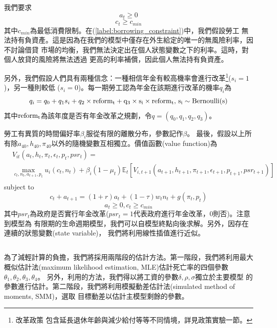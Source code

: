 \documentclass[12pt]{article}
\begin{document}
\begin{CJK*}{UTF8}{bkai}
我們要求
\begin{equation}\label{label:borrowing_constraint}
    a_t \geq 0
\end{equation}
\begin{equation}
    c_t \geq c_{min}
\end{equation}
其中$c_{min}$為最低消費限制。在(\ref{label:borrowing_constraint})中，我們假設勞工
無法持有負資產。這是因為在我們的模型中僅存在外生給定的唯一的無風險利率，因不討論借貸
市場的均衡，我們無法決定出在個人狀態變數之下的利率。這時，對個人放貸的風險將無法透過
更高的利率補償，因此個人無法持有負資產。

另外，我們假設人們具有兩種信念：一種相信年金有較高機率會進行改革\footnote{改革政策
包含延長退休年齡與減少給付等等不同情境，詳見政策實驗一節。}($s_i=1$)，另一種則較低
($s_i=0$)。每一期勞工認為年金在該期進行改革的機率$q_i$為
\begin{equation}
    q_i = q_0 + q_1 s_i + q_2\times \rm{reform_t} + q_3\times s_i\times \rm{reform_t} \text{, } s_i \sim Bernoulli(s)
\end{equation}
其中$\rm{reform_t}$為該年度是否有年金改革之規劃，令$q=(q_0, q_1, q_2, q_3)$。

勞工有異質的時間偏好率$\beta_i$服從有限的離散分布，參數記作$\beta$。
最後，假設以上所有除$a_{40}, h_{40}, \pi_{40}$以外的隨機變數互相獨立。價值函數(value function)為
\begin{equation}
    \begin{split}
        &V_{it}(a_t,h_t,\pi_t,\epsilon_t,p_t,psr_t) = \\
        &\max_{c_t,n_t,a_{t+1},p_t} u_i(c_t,n_t) 
        + \beta_i (1-\mu_t) \mathbb{E}_t[V_{i,t+1}(a_{t+1},h_{t+1},\pi_{t+1},\epsilon_{t+1},p_{t+1},psr_{t+1})] \\
    \end{split}
\end{equation}
subject to
\begin{equation}
    c_t + a_{t+1} = (1+r)a_t + (1-\tau) w_t n_t + g(\pi_t,p_t)
\end{equation}
\begin{equation}
    a_t \geq 0, c_t \geq c_{min} 
\end{equation}
其中$psr_t$為政府是否實行年金改革($psr_t=1$代表政府進行年金改革，0則否)。注意到模型為
有限期的生命週期模型，我們可以自模型終點向後求解。另外，因存在連續的狀態變數(state variable)，
我們將利用線性插值進行近似。

\subsection*{}
為了減輕計算的負擔，我們將採用兩階段的估計方法。第一階段，我們將利用最大概似估計法(maximum 
likelihood estimation, MLE)估計死亡率的四個參數$\theta_1,\theta_2,\theta_3,\theta_4$。
另外，利用\cite{french2005}的方法，我們得以將工資的參數$\delta,\rho,\sigma$獨立於主要模型
的參數進行估計。第二階段，我們將利用模擬動差估計法(simulated method of moments, SMM)，選取
目標動差以估計主模型剩餘的參數。


\end{CJK*}
\end{document}
